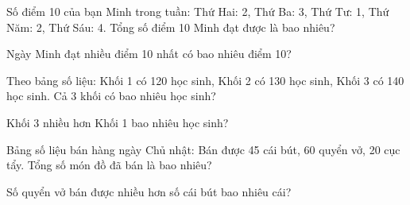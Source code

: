 \begin{ex}
Số điểm 10 của bạn Minh trong tuần: Thứ Hai: 2, Thứ Ba: 3, Thứ Tư: 1, Thứ Năm: 2, Thứ Sáu: 4. Tổng số điểm 10 Minh đạt được là bao nhiêu?
\end{ex}

\begin{ex}
Ngày Minh đạt nhiều điểm 10 nhất có bao nhiêu điểm 10?
\end{ex}

\begin{ex}
Theo bảng số liệu: Khối 1 có 120 học sinh, Khối 2 có 130 học sinh, Khối 3 có 140 học sinh. Cả 3 khối có bao nhiêu học sinh?
\end{ex}

\begin{ex}
Khối 3 nhiều hơn Khối 1 bao nhiêu học sinh?
\end{ex}

\begin{ex}
Bảng số liệu bán hàng ngày Chủ nhật: Bán được 45 cái bút, 60 quyển vở, 20 cục tẩy. Tổng số món đồ đã bán là bao nhiêu?
\end{ex}

\begin{ex}
Số quyển vở bán được nhiều hơn số cái bút bao nhiêu cái?
\end{ex}
